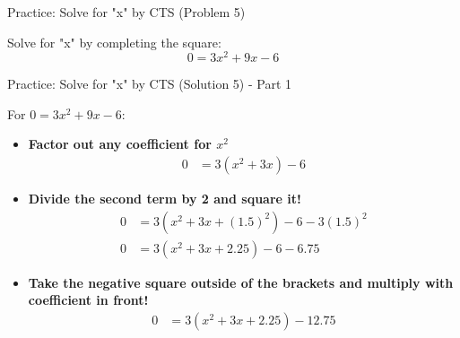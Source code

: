 \documentclass[aspectratio=169]{beamer}
\begin{document}
\begin{frame}{Practice: Solve for "x" by CTS (Problem 5)}
    \begin{tcolorbox}[colback=lightgray,colframe=primary,title=Problem 5]
        \footnotesize
        Solve for "x" by completing the square:
        \[ 0 = 3x^2 + 9x - 6 \]
    \end{tcolorbox}
\end{frame}

\begin{frame}{Practice: Solve for "x" by CTS (Solution 5) - Part 1}
    \begin{tcolorbox}[colback=lightgray,colframe=accent,title=Solution 5 - Part 1]
        \footnotesize
        For $0 = 3x^2 + 9x - 6$:
        \begin{itemize}
            \item \textbf{Factor out any coefficient for $x^2$}
                \begin{align*}
                    0 &= 3(x^2 + 3x) - 6
                \end{align*}
            \item \textbf{Divide the second term by 2 and square it!}
                \begin{align*}
                    0 &= 3\left(x^2 + 3x + (1.5)^2\right) - 6 - 3(1.5)^2 \\
                    0 &= 3(x^2 + 3x + 2.25) - 6 - 6.75
                \end{align*}
            \item \textbf{Take the negative square outside of the brackets and multiply with coefficient in front!}
                \begin{align*}
                    0 &= 3(x^2 + 3x + 2.25) - 12.75
                \end{align*}
        \end{itemize}
    \end{tcolorbox}
\end{frame}
\end{document}
